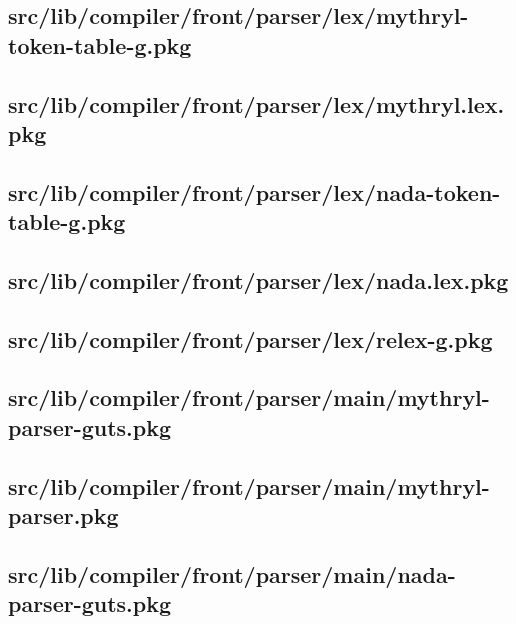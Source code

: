 \subsection{src/lib/compiler/front/parser/lex/mythryl-token-table-g.pkg}


\subsection{src/lib/compiler/front/parser/lex/mythryl.lex.pkg}


\subsection{src/lib/compiler/front/parser/lex/nada-token-table-g.pkg}


\subsection{src/lib/compiler/front/parser/lex/nada.lex.pkg}


\subsection{src/lib/compiler/front/parser/lex/relex-g.pkg}


\subsection{src/lib/compiler/front/parser/main/mythryl-parser-guts.pkg}


\subsection{src/lib/compiler/front/parser/main/mythryl-parser.pkg}


\subsection{src/lib/compiler/front/parser/main/nada-parser-guts.pkg}


